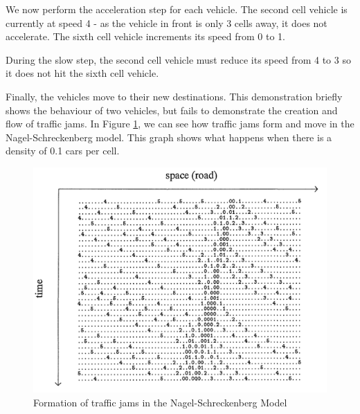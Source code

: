 \documentclass[ %
                    author={Alexander Hill},
                supervisor={Dr. Benjamin Sach},
                    degree={MEng},
                     title={MARMOSET},
                  subtitle={Multi-Agent Route Management using Online Simulation for Efficient Transportation},
                      type={research},
                      year={2016} ]{dissertation}
\begin{document}
\begin{figure}[!h]
\centering
{}
\end{figure}

We now perform the acceleration step for each vehicle. The second cell vehicle
is currently at speed 4 - as the vehicle in front is only 3 cells away, it does
not accelerate. The sixth cell vehicle increments its speed from 0 to 1.

During the slow step, the second cell vehicle must reduce its speed from 4 to 3
so it does not hit the sixth cell vehicle.

\begin{figure}[!h]
\centering
{}
\end{figure}

Finally, the vehicles move to their new destinations. This demonstration briefly
shows the behaviour of two vehicles, but fails to demonstrate the creation and
flow of traffic jams. In Figure \ref{nagel-demo}, we can see how traffic jams
form and move in the Nagel-Schreckenberg model. This graph shows what happens
when there is a density of 0.1 cars per cell.

\begin{figure}[h]
    \centering
    \includegraphics[scale=0.4]{nagel}
    \caption{Formation of traffic jams in the Nagel-Schreckenberg Model}\label{nagel-demo}
\end{figure}
\end{document}
